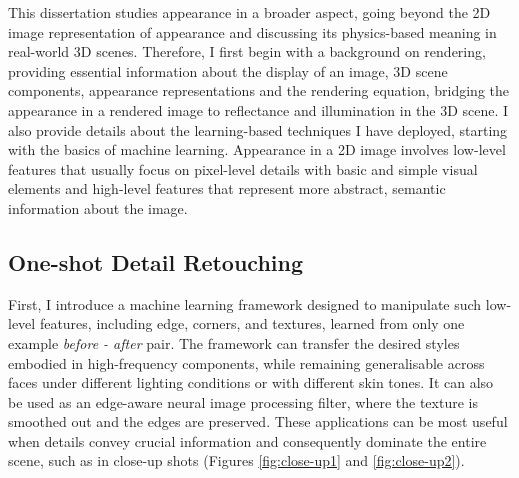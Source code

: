 This dissertation studies appearance in a broader aspect, going beyond the 2D image representation of appearance and discussing its physics-based meaning in real-world 3D scenes. Therefore, I first begin with a background on rendering, providing essential information about the display of an image, 3D scene components, appearance representations and the rendering equation, bridging the appearance in a rendered image to reflectance and illumination in the 3D scene. I also provide details about the learning-based techniques I have deployed, starting with the basics of machine learning. Appearance in a 2D image involves low-level features that usually focus on pixel-level details with basic and simple visual elements and high-level features that represent more abstract, semantic information about the image. 

\subsection{One-shot Detail Retouching}
 First, I introduce a machine learning framework designed to manipulate such low-level features, including edge, corners, and textures, learned from only one example \textit{before - after} pair.  The framework can transfer the desired styles embodied in high-frequency components, while remaining generalisable across faces under different lighting conditions or with different skin tones. It can also be used as an edge-aware neural image processing filter, where the texture is smoothed out and the edges are preserved. These applications can be most useful when details convey crucial information and consequently dominate the entire scene, such as in close-up shots (Figures \ref{fig:close-up1} and \ref{fig:close-up2}). 





